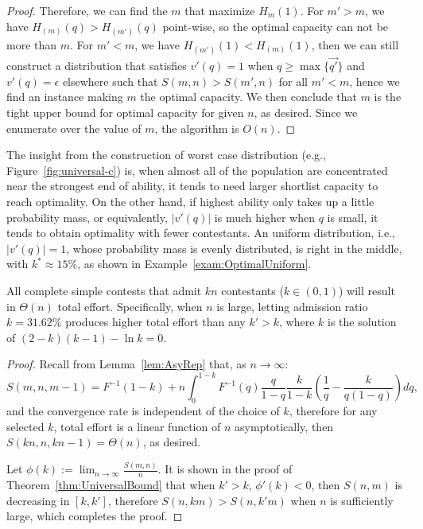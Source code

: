 \begin{proof}
Therefore, we can find the $m$ that maximize $H_{m}(1)$. For $m'>m$, we have $H_{(m)}(q) > H_{(m')}(q)$ point-wise, so the optimal capacity can not be more than $m$. For $m'<m$, we have $H_{(m')}(1) < H_{(m)}(1)$, then we can still construct a distribution that satisfies $v'(q)=1$ when $q \geq \max\{\vec{q'}\}$ and $v'(q) = \epsilon$ elsewhere such that $S(m,n) > S(m',n)$ for all $m'<m$, hence we find an instance making $m$ the optimal capacity. We then conclude that $m$ is the tight upper bound for optimal capacity for given $n$, as desired. Since we enumerate over the value of $m$, the algorithm is $O(n)$. 
\end{proof}
\begin{remark}
    The insight from the construction of worst case distribution (e.g., Figure~\ref{fig:universal-c}) is, when almost all of the population are concentrated near the strongest end of ability, it tends to need larger shortlist capacity to reach optimality. On the other hand, if highest ability only takes up a little probability mass, or equivalently, $|v'(q)|$ is much higher when $q$ is small, it tends to obtain optimality with fewer contestants. An uniform distribution, i.e., $|v'(q)|=1$, whose probability mass is evenly distributed, is right in the middle, with $k^*\approx15\%$, as shown in Example~\ref{exam:OptimalUniform}. 
\end{remark}

\begin{corollary}\label{coro:shortlistAlways}
    All complete simple contests that admit $kn$ contestants ($k\in (0,1)$) will result in $\Theta(n)$ total effort. Specifically, when $n$ is large, letting admission ratio $k=31.62\%$ produces higher total effort than any $k'>k$, where $k$ is the solution of $(2-k)(k-1)-\ln k=0$.
\end{corollary}
\begin{proof}
    Recall from Lemma~\ref{lem:AsyRep} that, as $n\to \infty$:
\[
S(m,n,m-1)=F^{-1}(1-k)+n\int_0^{1-k}F^{-1}(q)\frac{q}{1-q}\frac{k}{1-k}(\frac{1}{q}-\frac{k}{q(1-q)})dq,\]
and the convergence rate is independent of the choice of $k$, therefore for any selected $k$, total effort is a linear function of $n$ asymptotically, then $S(kn,n,kn-1)=\Theta(n)$, as desired. 

Let $\phi(k):=\lim_{n\to \infty}\frac{S(m,n)}{n}$. It is shown in the proof of Theorem~\ref{thm:UniversalBound} that when $k'>k$, $\phi'(k) < 0$, then $S(n,m)$ is decreasing in $[k,k']$, therefore $S(n,km) > S(n,k'm)$ when $n$ is sufficiently large, which completes the proof.
\end{proof}